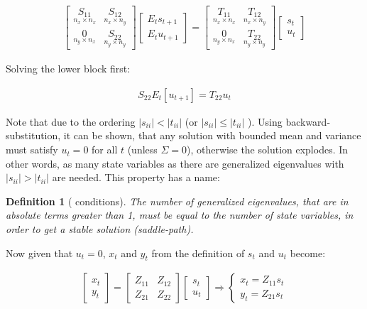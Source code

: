 \documentclass{pracamgr}
\numberwithin{equation}{section}
\newtheorem{mydef}{Definition}
\begin{document}
\begin{align}
\begin{bmatrix} \underset{n_x \times n_x}{S_{11}} & \underset{n_x \times n_y}{S_{12}} \\ \underset{n_y \times n_x}{0} & \underset{n_y \times n_y}{S_{22}}\end{bmatrix} \begin{bmatrix} E_t s_{t+1}\\ E_t u_{t+1} \end{bmatrix} = \begin{bmatrix} \underset{n_x \times n_x}{T_{11}} & \underset{n_x \times n_y}{T_{12}} \\ \underset{n_y \times n_x}{0} & \underset{n_y \times n_y}{T_{22}}\end{bmatrix} \begin{bmatrix} s_t \\ u_t \end{bmatrix}
\end{align}

Solving the lower block first:

\begin{align}
  S_{22} E_t[u_{t+1}] = T_{22} u_t
\end{align}

Note that due to the ordering $|s_{ii}|<|t_{ii}|$ (or $|s_{ii}|\leq|t_{ii}|$ ). Using backward-substitution, it can be shown, that any solution with bounded mean and variance must satisfy $u_t=0$ for all $t$ (unless $\Sigma=0$), otherwise the solution explodes. In other words, as many state variables as there are generalized eigenvalues with $|s_{ii}|>|t_{ii}|$ are needed. This property has a name:

\begin{mydef}[\citet{blanchard1980solution} conditions]
The number of generalized eigenvalues, that are in absolute terms greater than 1, must be equal to the number of state variables, in order to get a stable solution (saddle-path).
\end{mydef}

Now given that $u_t=0$, $x_t$ and $y_t$ from the definition of $s_t$ and $u_t$ become:

\begin{align}
  \begin{bmatrix} x_t \\ y_t \end{bmatrix} = \begin{bmatrix} Z_{11} & Z_{12}\\ Z_{21} & Z_{22} \end{bmatrix} \begin{bmatrix} s_t \\ u_t \end{bmatrix}
  \Rightarrow
  \begin{cases}
    x_t = Z_{11} s_t\\
    y_t = Z_{21} s_t
  \end{cases}
\end{align}
\end{document}
